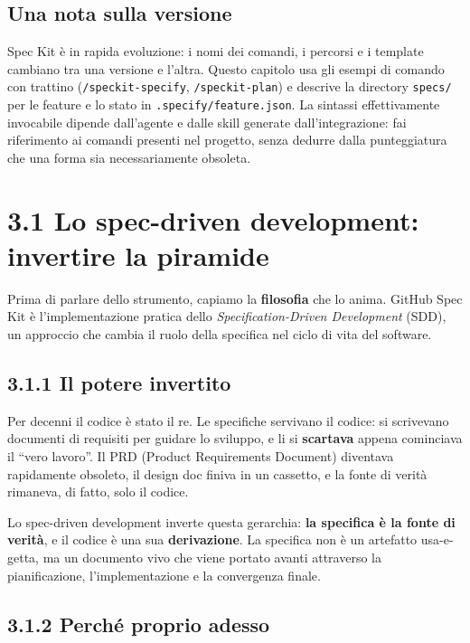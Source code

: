 \documentclass[
  italian,
  10pt,
]{book}
\begin{document}
\subsection{Una nota sulla versione}\label{una-nota-sulla-versione}

Spec Kit è in rapida evoluzione: i nomi dei comandi, i percorsi e i
template cambiano tra una versione e l'altra. Questo capitolo usa gli
esempi di comando con trattino (\texttt{/speckit-specify},
\texttt{/speckit-plan}) e descrive la directory \texttt{specs/} per le
feature e lo stato in \texttt{.specify/feature.json}. La sintassi
effettivamente invocabile dipende dall'agente e dalle skill generate
dall'integrazione: fai riferimento ai comandi presenti nel progetto,
senza dedurre dalla punteggiatura che una forma sia necessariamente
obsoleta.

\section{3.1 Lo spec-driven development: invertire la
piramide}\label{lo-spec-driven-development-invertire-la-piramide}

Prima di parlare dello strumento, capiamo la \textbf{filosofia} che lo
anima. GitHub Spec Kit è l'implementazione pratica dello
\emph{Specification-Driven Development} (SDD), un approccio che cambia
il ruolo della specifica nel ciclo di vita del software.

\subsection{3.1.1 Il potere invertito}\label{il-potere-invertito}

Per decenni il codice è stato il re. Le specifiche servivano il codice:
si scrivevano documenti di requisiti per guidare lo sviluppo, e li si
\textbf{scartava} appena cominciava il ``vero lavoro''. Il PRD (Product
Requirements Document) diventava rapidamente obsoleto, il design doc
finiva in un cassetto, e la fonte di verità rimaneva, di fatto, solo il
codice.

Lo spec-driven development inverte questa gerarchia: \textbf{la
specifica è la fonte di verità}, e il codice è una sua
\textbf{derivazione}. La specifica non è un artefatto usa-e-getta, ma un
documento vivo che viene portato avanti attraverso la pianificazione,
l'implementazione e la convergenza finale.

\subsection{3.1.2 Perché proprio adesso}\label{perchuxe9-proprio-adesso}
\end{document}
